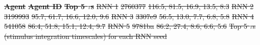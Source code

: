 \documentclass[5p,twocolumn,authoryear]{elsarticle}
\providecommand{\DIFdeltex}[1]{{\protect\color{red}\sout{#1}}}                      %
\providecommand{\DIFdelend}{} %
\providecommand{\DIFdelFL}[1]{\DIFdel{#1}} %
\providecommand{\DIFdel}[1]{\texorpdfstring{\DIFdeltex{#1}}{}} %
\DeclareRobustCommand{\DIFdelend}{\DIFOaddend \let\includegraphics\DIFOincludegraphics} %
\begin{document}

\textbf{\DIFdelFL{Agent}} %
\textbf{\DIFdelFL{Agent ID}} %
\textbf{\DIFdelFL{Top 5 $\tau$s}}  %
\DIFdelFL{RNN 1 }%
\DIFdelFL{2760377 }%
\DIFdelFL{116.5, 81.5, 16.9, 13.5, 8.3  }%
\DIFdelFL{RNN 2 }%
\DIFdelFL{3199993 }%
\DIFdelFL{95.7, 61.7, 16.6, 12.0, 9.6  }%
\DIFdelFL{RNN 3 }%
\DIFdelFL{3307e9 }%
\DIFdelFL{56.5, 13.0, 7.7, 6.8, 5.8  }%
\DIFdelFL{RNN 4 }%
\DIFdelFL{541058 }%
\DIFdelFL{86.4, 51.8, 15.1, 12.4, 9.7  }%
\DIFdelFL{RNN 5 }%
\DIFdelFL{9781ba }%
\DIFdelFL{86.2, 27.4, 8.6, 6.6, 5.6  }%
\DIFdelFL{Top 5 $\tau$s (stimulus integration timescales) for each RNN seed}%
\DIFdelend %
\end{document}
